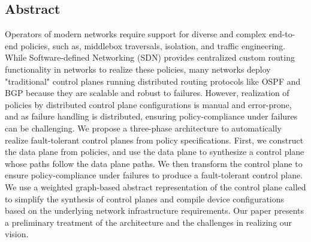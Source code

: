 \subsection*{Abstract}
Operators of modern networks
require support for diverse and complex end-to-end policies, such
as, middlebox traversals, isolation, and traffic engineering. While 
Software-defined Networking (SDN) provides centralized 
custom routing functionality
in networks to realize these policies, many networks deploy "traditional"
control planes running distributed routing protocols like OSPF and BGP
because they are scalable and robust to failures. However, realization of 
policies by distributed control plane configurations is manual and error-prone,
and as failure handling is distributed, ensuring policy-compliance under failures 
can be challenging. We propose a three-phase 
architecture to automatically realize 
fault-tolerant control planes from policy specifications. First, we 
construct the data plane from policies, and use the data plane to 
synthesize a control plane whose paths follow the data plane paths. 
We then transform the control plane to ensure policy-compliance
under failures to produce a fault-tolerant control plane. 
We use a weighted graph-based abstract representation 
of the control plane called \ARC to simplify the synthesis of control 
planes and compile device configurations based on the underlying
network infrastructure requirements. Our paper presents a preliminary 
treatment of the architecture and the challenges in realizing our vision. 
